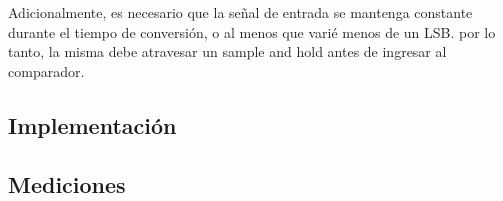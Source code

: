 \documentclass[assd_tp3_main.tex]{subfiles}
\begin{document}
Adicionalmente, es necesario que la se\~nal de entrada se mantenga constante durante el tiempo de conversi\'on, o al menos que vari\'e menos de un LSB. por lo tanto, la misma debe atravesar un sample and hold antes de ingresar al comparador.



\subsection{Implementaci\'on}






\subsection{Mediciones}
\end{document}

